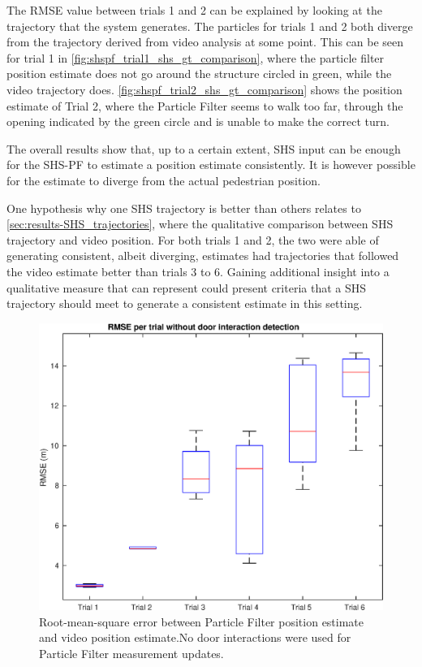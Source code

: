 The RMSE value between trials 1 and 2 can be explained by looking at the trajectory that the system generates. The particles for trials 1 and 2 both diverge from the trajectory derived from video analysis at some point. This can be seen for trial 1 in  \cref{fig:shspf_trial1_shs_gt_comparison}, where the particle filter position estimate does not go around the structure circled in green, while the video trajectory does. \cref{fig:shspf_trial2_shs_gt_comparison} shows the position estimate of Trial 2, where the Particle Filter seems to walk too far, through the opening indicated by the green circle and is unable to make the correct turn. \par 

The overall results show that, up to a certain extent, SHS input can be enough for the SHS-PF to estimate a position estimate consistently. It is however possible for the estimate to diverge from the actual pedestrian position.

One hypothesis why one SHS trajectory is better than others relates to \cref{sec:results-SHS_trajectories}, where the qualitative comparison between SHS trajectory and video position. For both trials 1 and 2, the two were able of generating consistent, albeit diverging, estimates had trajectories that followed the video estimate better than trials 3 to 6. Gaining additional insight into a qualitative measure that can represent could present criteria that a SHS trajectory should meet to generate a consistent estimate in this setting. 

\begin{figure}[H]
	\centering
	\includegraphics[width=0.7\linewidth]{images/20201202_2216_last_image_for_thesis_1}
	\caption{Root-mean-square error between Particle Filter position estimate and video position estimate.No door interactions were used for Particle Filter measurement updates.}
	\label{fig:placeholder}
\end{figure}




